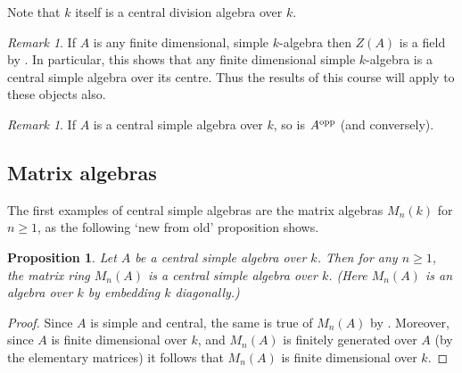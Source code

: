 \documentclass[11pt]{amsart}
\numberwithin{equation}{section}
\newtheorem{lemma}[equation]{Lemma}
\newtheorem{proposition}[equation]{Proposition}
\theoremstyle{remark}
\newtheorem{remark}[equation]{Remark}
\theoremstyle{remark}
\theoremstyle{remark}
\theoremstyle{definition}
\theoremstyle{definition}
\theoremstyle{definition}
\theoremstyle{definition}
\theoremstyle{definition}
\theoremstyle{definition}
\begin{document}
Note that $k$ itself is a central division algebra over $k$.

\begin{remark} \label{centre is a field}
If $A$ is any finite dimensional, simple $k$-algebra then $Z(A)$ is a field by . In particular, this shows that any finite dimensional simple $k$-algebra is a central simple algebra over its centre. Thus the results of this course will apply to these objects also.
\end{remark}

\begin{remark}
If $A$ is a central simple algebra over $k$, so is $A^\textup{opp}$ (and conversely). 
\end{remark}

\subsection{Matrix algebras}

The first examples of central simple algebras are the matrix algebras $M_n(k)$ for $n\geq 1$, as the following `new from old' proposition shows.

\begin{proposition} \label{matrix algebras}
Let $A$ be a central simple algebra over $k$. Then for any $n\geq 1$, the matrix ring $M_n(A)$ is a central simple algebra over $k$. (Here $M_n(A)$ is an algebra over $k$ by embedding $k$ diagonally.)
\end{proposition}

\begin{proof}
Since $A$ is simple and central, the same is true of $M_n(A)$ by . Moreover, since $A$ is finite dimensional over $k$, and $M_n(A)$ is finitely generated over $A$ (by the elementary matrices) it follows that $M_n(A)$ is finite dimensional over $k$. 
\end{proof}

%
%
%
\end{document}
